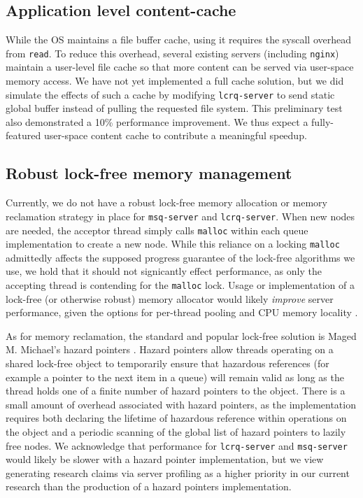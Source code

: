 \documentclass[twoside,10pt]{article}
\begin{document}
\begin{multicols}{2}
\subsection{Application level content-cache}
While the OS maintains a file buffer cache, using it requires the
syscall overhead from \verb+read+. To reduce this overhead, several
existing servers (including \verb+nginx+) maintain a user-level file
cache so that more content can be served via user-space memory
access. We have not yet implemented a full cache solution, but we did
simulate the effects of such a cache by modifying \verb+lcrq-server+
to send static global buffer instead of pulling the requested file
system. This preliminary test also demonstrated a 10\% performance
improvement. We thus expect a fully-featured user-space content cache
to contribute a meaningful speedup.

\subsection{Robust lock-free memory management}

Currently, we do not have a robust lock-free memory allocation or
memory reclamation strategy in place for \verb+msq-server+ and
\verb+lcrq-server+. When new nodes are needed, the acceptor thread
simply calls \verb+malloc+ within each queue implementation to create
a new node. While this reliance on a locking \verb+malloc+ admittedly
affects the supposed progress guarantee of the lock-free algorithms we
use, we hold that it should not signicantly effect performance, as
only the accepting thread is contending for the \verb+malloc+
lock. Usage or implementation of a lock-free (or otherwise robust)
memory allocator would likely \emph{improve} server performance, given the
options for per-thread pooling and CPU memory locality
\cite{hart2007performance}.

As for memory reclamation, the standard and popular lock-free solution
is Maged M. Michael's hazard pointers \cite{michael2004hazard}. Hazard
pointers allow threads operating on a shared lock-free object to
temporarily ensure that hazardous references (for example a pointer to
the next item in a queue) will remain valid as long as the thread
holds one of a finite number of hazard pointers to the object. There
is a small amount of overhead associated with hazard pointers, as the
implementation requires both declaring the lifetime of hazardous
reference within operations on the object and a periodic scanning of
the global list of hazard pointers to lazily free nodes. We
acknowledge that performance for \verb+lcrq-server+ and
\verb+msq-server+ would likely be slower with a hazard pointer
implementation, but we view generating research claims via server
profiling as a higher priority in our current research than the
production of a hazard pointers implementation.


\end{multicols}
\end{document}
